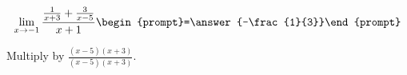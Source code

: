 \documentclass{ximera}
\author{Bart Snapp}
\begin{document}
\begin{exercise}

\[
\lim_{x\to -1 } \frac{\frac{1}{x+3}+\frac{3}{x-5}}{x+1}  \begin{prompt}=\answer{-\frac{1}{3}}\end{prompt}
\]
\begin{hint}
Multiply by $\frac{(x-5) (x+3)}{(x-5) (x+3)}$.
\end{hint}
\end{exercise}
\end{document}
